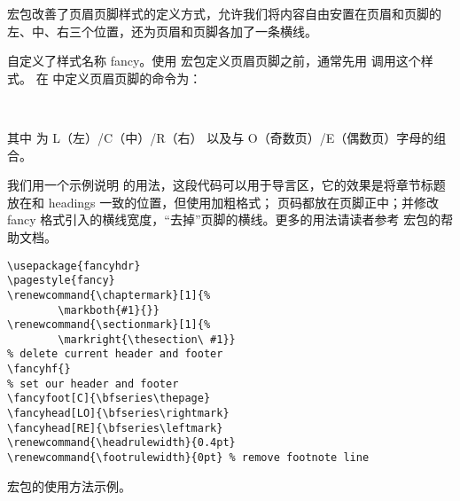  宏包改善了页眉页脚样式的定义方式，允许我们将内容自由安置在页眉和页脚的左、中、右三个位置，还为页眉和页脚各加了一条横线。

 自定义了样式名称 fancy。使用  宏包定义页眉页脚之前，通常先用  调用这个样式。
在  中定义页眉页脚的命令为：
\begin{command}
\\
\end{command}
其中  为 L（左）/C（中）/R（右） 以及与 O（奇数页）/E（偶数页）字母的组合。

我们用一个示例说明  的用法，这段代码可以用于导言区，它的效果是将章节标题放在和 headings 一致的位置，但使用加粗格式；
页码都放在页脚正中；并修改 fancy 格式引入的横线宽度，“去掉”页脚的横线。更多的用法请读者参考  宏包的帮助文档。

\begin{sourcecode}[hbp]
\begin{Verbatim}
\usepackage{fancyhdr}
\pagestyle{fancy}
\renewcommand{\chaptermark}[1]{%
        \markboth{#1}{}}
\renewcommand{\sectionmark}[1]{%
        \markright{\thesection\ #1}}
% delete current header and footer
\fancyhf{}
% set our header and footer
\fancyfoot[C]{\bfseries\thepage}
\fancyhead[LO]{\bfseries\rightmark}
\fancyhead[RE]{\bfseries\leftmark}
\renewcommand{\headrulewidth}{0.4pt}
\renewcommand{\footrulewidth}{0pt} % remove footnote line
\end{Verbatim}
\caption{ 宏包的使用方法示例。}
\end{sourcecode}

\endinput